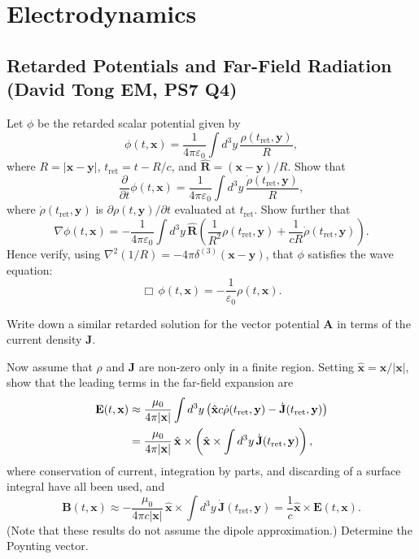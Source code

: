 \section{Electrodynamics}
\subsection{Retarded Potentials and Far-Field Radiation (David Tong EM, PS7 Q4)}
\label{sec:retarded-potentials}
Let $\phi$ be the retarded scalar potential given by
\begin{equation}
  \phi(t,\mathbf{x}) = \frac{1}{4\pi\varepsilon_0}\int d^3y\,
  \frac{\rho(t_{\mathrm{ret}},\mathbf{y})}{R},
\end{equation}
where $R = |\mathbf{x}-\mathbf{y}|$, $t_{\mathrm{ret}} = t - R/c$, and
$\hat{\mathbf{R}} = (\mathbf{x}-\mathbf{y})/R$. Show that
\begin{equation}
  \frac{\partial}{\partial t}\phi(t,\mathbf{x})
  = \frac{1}{4\pi\varepsilon_0}\int d^3y\,
  \frac{\dot{\rho}(t_{\mathrm{ret}},\mathbf{y})}{R},
\end{equation}
where $\dot{\rho}(t_{\mathrm{ret}},\mathbf{y})$ is $\partial\rho(t,\mathbf{y})/\partial t$
evaluated at $t_{\mathrm{ret}}$. Show further that
\begin{equation}
  \nabla\phi(t,\mathbf{x}) = -\frac{1}{4\pi\varepsilon_0}\int d^3y\,\hat{\mathbf{R}}
  \left(\frac{1}{R^2}\rho(t_{\mathrm{ret}},\mathbf{y})
  + \frac{1}{cR}\dot{\rho}(t_{\mathrm{ret}},\mathbf{y})\right).
\end{equation}
Hence verify, using $\nabla^2(1/R) = -4\pi\delta^{(3)}(\mathbf{x}-\mathbf{y})$,
that $\phi$ satisfies the wave equation:
\begin{equation}
    \Box\,\phi(t,\mathbf{x}) = -\frac{1}{\varepsilon_0}\rho(t,\mathbf{x}).
\end{equation}

Write down a similar retarded solution for the vector potential $\mathbf{A}$
in terms of the current density $\mathbf{J}$.

Now assume that $\rho$ and $\mathbf{J}$ are non-zero only in a finite region.
Setting $\hat{\mathbf{x}} = \mathbf{x}/|\mathbf{x}|$, show that the leading
terms in the far-field expansion are
\begin{align}
  \mathbf{E}(t,\mathbf{x})
  &\approx \frac{\mu_0}{4\pi|\mathbf{x}|}\int d^3y
    \left(\hat{\mathbf{x}}c\dot{\rho}(t_{\mathrm{ret}},\mathbf{y})
    - \dot{\mathbf{J}}(t_{\mathrm{ret}},\mathbf{y})\right) \notag\\
  &= \frac{\mu_0}{4\pi|\mathbf{x}|}\,\hat{\mathbf{x}}\times
    \left(\hat{\mathbf{x}}\times\int d^3y\,
    \dot{\mathbf{J}}(t_{\mathrm{ret}},\mathbf{y})\right),
\end{align}
where conservation of current, integration by parts, and discarding of a
surface integral have all been used, and
\begin{equation}
  \mathbf{B}(t,\mathbf{x}) \approx -\frac{\mu_0}{4\pi c|\mathbf{x}|}\,
  \hat{\mathbf{x}}\times\int d^3y\,\dot{\mathbf{J}}(t_{\mathrm{ret}},\mathbf{y})
  = \frac{1}{c}\hat{\mathbf{x}}\times\mathbf{E}(t,\mathbf{x}).
\end{equation}
(Note that these results do not assume the dipole approximation.)
Determine the Poynting vector.

